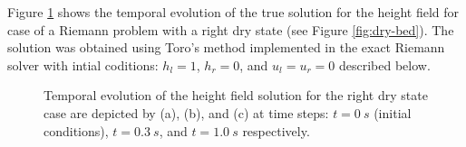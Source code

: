\documentclass[10pt,a4paper]{article}
\begin{document}
	Figure \ref{right}  shows the temporal evolution of the true solution  for the height field for case of a Riemann problem with a right dry state (see Figure \ref{fig:dry-bed}). The solution was obtained using Toro's method implemented in the exact Riemann solver with intial coditions: $h_l  = 1$, $h_r = 0$, and  $u_l = u_r = 0$ described  below.
\begin{figure}[H]
	\hfill
	\caption{Temporal evolution of the height field solution for the right dry state case  are depicted by (a), (b), and (c) at time steps: $t=0~s$ (initial conditions), $t = 0.3~s$, and $t = 1.0~s$ respectively. }
	\label{right}
\end{figure}
\end{document}
